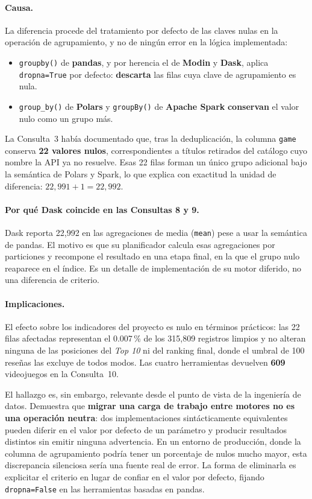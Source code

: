 \paragraph{Causa.} La diferencia procede del tratamiento por defecto de las claves nulas en la operación de agrupamiento, y no de ningún error en la lógica implementada:

\begin{itemize}[leftmargin=*]
    \item \texttt{groupby()} de \textbf{pandas}, y por herencia el de \textbf{Modin} y \textbf{Dask}, aplica \texttt{dropna=True} por defecto: \textbf{descarta} las filas cuya clave de agrupamiento es nula.
    \item \texttt{group\_by()} de \textbf{Polars} y \texttt{groupBy()} de \textbf{Apache Spark} \textbf{conservan} el valor nulo como un grupo más.
\end{itemize}

La Consulta~3 había documentado que, tras la deduplicación, la columna \texttt{game} conserva \textbf{22 valores nulos}, correspondientes a títulos retirados del catálogo cuyo nombre la API ya no resuelve. Esas 22 filas forman un único grupo adicional bajo la semántica de Polars y Spark, lo que explica con exactitud la unidad de diferencia: $22{,}991 + 1 = 22{,}992$.

\paragraph{Por qué Dask coincide en las Consultas 8 y 9.} Dask reporta 22,992 en las agregaciones de media (\texttt{mean}) pese a usar la semántica de pandas. El motivo es que su planificador calcula esas agregaciones por particiones y recompone el resultado en una etapa final, en la que el grupo nulo reaparece en el índice. Es un detalle de implementación de su motor diferido, no una diferencia de criterio.

\paragraph{Implicaciones.} El efecto sobre los indicadores del proyecto es nulo en términos prácticos: las 22 filas afectadas representan el 0.007\,\% de los 315,809 registros limpios y no alteran ninguna de las posiciones del \textit{Top 10} ni del ranking final, donde el umbral de 100 reseñas las excluye de todos modos. Las cuatro herramientas devuelven \textbf{609} videojuegos en la Consulta~10.

El hallazgo es, sin embargo, relevante desde el punto de vista de la ingeniería de datos. Demuestra que \textbf{migrar una carga de trabajo entre motores no es una operación neutra}: dos implementaciones sintácticamente equivalentes pueden diferir en el valor por defecto de un parámetro y producir resultados distintos sin emitir ninguna advertencia. En un entorno de producción, donde la columna de agrupamiento podría tener un porcentaje de nulos mucho mayor, esta discrepancia silenciosa sería una fuente real de error. La forma de eliminarla es explicitar el criterio en lugar de confiar en el valor por defecto, fijando \texttt{dropna=False} en las herramientas basadas en pandas.


